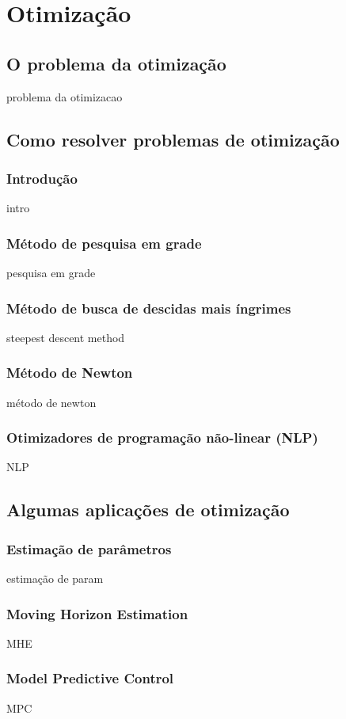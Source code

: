 \chapter{Otimização}

\section{O problema da otimização}

problema da otimizacao

\section{Como resolver problemas de otimização}

\subsection{Introdução}

intro

\subsection{Método de pesquisa em grade}

pesquisa em grade

\subsection{Método de busca de descidas mais íngrimes}

steepest descent method

\subsection{Método de Newton}

método de newton

\subsection{Otimizadores de programação não-linear (NLP)}

NLP

\section{Algumas aplicações de otimização}

\subsection{Estimação de parâmetros}

estimação de param

\subsection{Moving Horizon Estimation}

MHE

\subsection{Model Predictive Control}

MPC